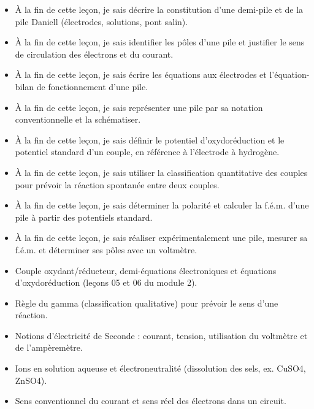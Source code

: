 \documentclass[11pt]{article}
\begin{document}
\begin{objectifs}
\begin{itemize}
\item À la fin de cette leçon, je sais décrire la constitution d'une demi-pile et de la pile Daniell (électrodes, solutions, pont salin).
\item À la fin de cette leçon, je sais identifier les pôles d'une pile et justifier le sens de circulation des électrons et du courant.
\item À la fin de cette leçon, je sais écrire les équations aux électrodes et l'équation-bilan de fonctionnement d'une pile.
\item À la fin de cette leçon, je sais représenter une pile par sa notation conventionnelle et la schématiser.
\item À la fin de cette leçon, je sais définir le potentiel d'oxydoréduction et le potentiel standard d'un couple, en référence à l'électrode à hydrogène.
\item À la fin de cette leçon, je sais utiliser la classification quantitative des couples pour prévoir la réaction spontanée entre deux couples.
\item À la fin de cette leçon, je sais déterminer la polarité et calculer la f.é.m. d'une pile à partir des potentiels standard.
\item À la fin de cette leçon, je sais réaliser expérimentalement une pile, mesurer sa f.é.m. et déterminer ses pôles avec un voltmètre.
\end{itemize}
\end{objectifs}

\begin{prerequis}
\begin{itemize}
\item Couple oxydant/réducteur, demi-équations électroniques et équations d'oxydoréduction (leçons 05 et 06 du module 2).
\item Règle du gamma (classification qualitative) pour prévoir le sens d'une réaction.
\item Notions d'électricité de Seconde : courant, tension, utilisation du voltmètre et de l'ampèremètre.
\item Ions en solution aqueuse et électroneutralité (dissolution des sels, ex. CuSO4, ZnSO4).
\item Sens conventionnel du courant et sens réel des électrons dans un circuit.
\end{itemize}
\end{prerequis}
\end{document}
